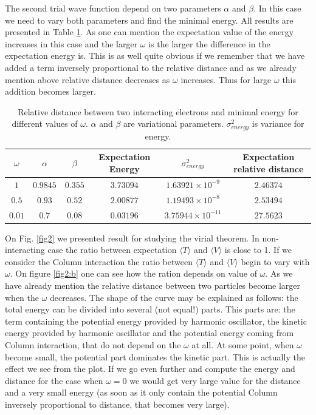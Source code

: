 \documentclass[10pt]{article}
\begin{document}
The second trial wave function depend on two parameters $\alpha$ and $\beta$. In this case we need to vary both parameters and find the minimal energy. All results are presented in Table \ref{tab:two}. As one can mention the expectation value of the energy increases in this case and the larger $\omega$ is the larger the difference in the expectation energy is. This is as well quite obvious if we remember that we have added a term inversely proportional to the relative distance and as we already mention above relative distance decreases as $\omega$ increases. Thus for large $\omega$ this addition becomes larger.
 
\begin{table}[h!]
  \caption{Relative distance between two interacting electrons and minimal energy for different values of $\omega$. $\alpha$ and $\beta$ are variational parameters. $\sigma^2_{energy}$ is variance for energy.}
  \label{tab:two}
  \begin{center}
    \begin{tabular}{c|c|c|c|c|c}
    \hline
		$\omega$ & $\alpha$& $\beta$ & Expectation Energy& $\sigma^2_{energy}$ & Expectation relative distance \\
    \hline
	$	1 $  & $0.9845$& $0.355$ & $3.73094$ & $1.63921 \times 10^{-9}$ & $2.46374$  \\
	$	0.5$  & $0.93$ & $0.52$ & $2.00877$ & $1.19493 \times 10^{-8}$ & $2.53494$   \\
	$	0.01$  & $0.7$ & $0.08$ & $0.03196$ & $3.75944 \times 10^{-11}$ & $27.5623$   \\
	\end{tabular}
  \end{center}
\end{table}


On Fig. \ref{fig2} we presented result for studying the virial theorem. In non-interacting case the ratio between expectation  $\langle T \rangle$  and   $\langle V \rangle$ is close to 1. If we consider the Column interaction the ratio between  $\langle T \rangle$  and   $\langle V \rangle$ begin to vary with $\omega$. On figure \ref{fig2:b} one can see how the ration depends on value of $\omega$. As we have already mention the relative distance between two particles become larger when the $\omega$ decreases. The shape of the curve may be explained as follows: the total energy can be divided into several (not equal!) parts. This parts are: the term containing the potential energy provided by harmonic oscillator, the kinetic energy provided by harmonic oscillator and the potential energy coming from Column interaction, that do not depend on the $\omega$ at all. At some point, when $\omega$ become small, the potential part dominates the kinetic part. This is actually the effect we see from the plot. If we go even further and compute the energy and distance for the case when $\omega =0$ we would get very large value for the distance and a very small energy (as soon as it only contain the potential Column inversely proportional to distance, that becomes very large).
\end{document}
